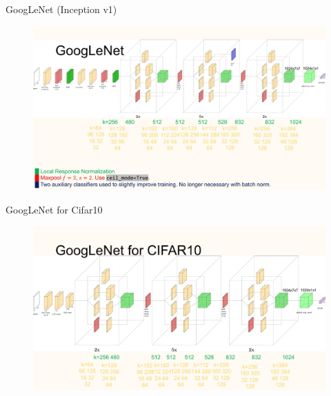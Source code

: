\begin{frame}[allowframebreaks]
\begin{mydefinitionblock}{7.17}{GoogLeNet (Inception v1)}
    \par\noindent\textcolor{gray}{\hdashrule{\textwidth}{0.4pt}{1pt 2pt}}

    \begin{figure}[H]
        \centering
        \includegraphics[width=1.0\textwidth]{.././assets/7.13.jpg}
    \end{figure}
\end{mydefinitionblock}

\end{frame}

\begin{frame}[allowframebreaks]

\begin{mydefinitionblock}{7.18}{GoogLeNet for Cifar10}
    \begin{figure}[H]
        \centering
        \includegraphics[width=1.0\textwidth]{.././assets/7.14.jpg}
    \end{figure}
\end{mydefinitionblock}

\end{frame}

